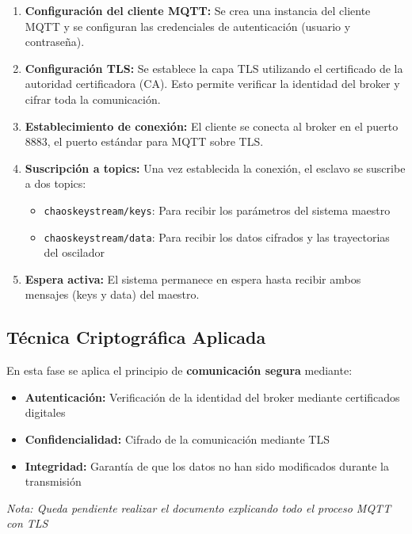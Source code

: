 \documentclass[12pt,a4paper]{article}
\begin{document}
	\begin{enumerate}
		\item \textbf{Configuración del cliente MQTT:} Se crea una instancia del cliente MQTT y se configuran las credenciales de autenticación (usuario y contraseña).
		
		\item \textbf{Configuración TLS:} Se establece la capa TLS utilizando el certificado de la autoridad certificadora (CA). Esto permite verificar la identidad del broker y cifrar toda la comunicación.
		
		\item \textbf{Establecimiento de conexión:} El cliente se conecta al broker en el puerto 8883, el puerto estándar para MQTT sobre TLS.
		
		\item \textbf{Suscripción a topics:} Una vez establecida la conexión, el esclavo se suscribe a dos topics:
		\begin{itemize}
			\item \texttt{chaoskeystream/keys}: Para recibir los parámetros del sistema maestro
			\item \texttt{chaoskeystream/data}: Para recibir los datos cifrados y las trayectorias del oscilador
		\end{itemize}
		
		\item \textbf{Espera activa:} El sistema permanece en espera hasta recibir ambos mensajes (keys y data) del maestro.
	\end{enumerate}
	
	\subsection{Técnica Criptográfica Aplicada}
	
	En esta fase se aplica el principio de \textbf{comunicación segura} mediante:
	\begin{itemize}
		\item \textbf{Autenticación:} Verificación de la identidad del broker mediante certificados digitales
		\item \textbf{Confidencialidad:} Cifrado de la comunicación mediante TLS
		\item \textbf{Integridad:} Garantía de que los datos no han sido modificados durante la transmisión
	\end{itemize}
	
	\textit{Nota: Queda pendiente realizar el documento explicando todo el proceso MQTT con TLS}
	
\end{document}
